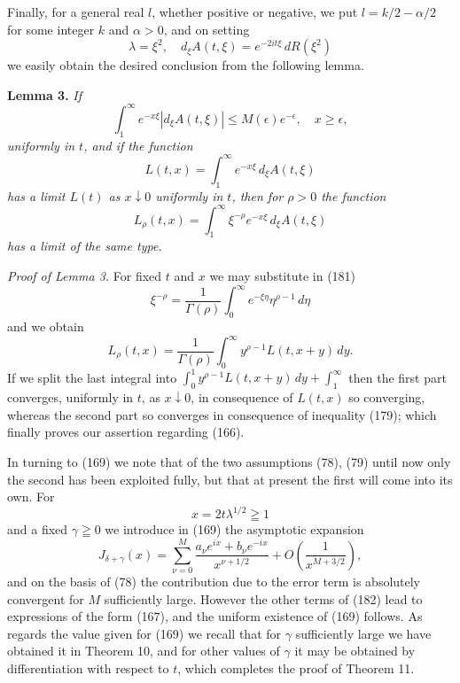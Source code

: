 \documentclass[12pt]{article}
\begin{document}
Finally, for a general real \(l\), whether positive or negative, we put \(l = k/2 - \alpha/2\) for some integer \(k\) and \(\alpha > 0\), and on setting
\[
\lambda = \xi^2, \quad d_\xi A(t, \xi) = e^{-2it\xi} \, dR(\xi^2)
\]
we easily obtain the desired conclusion from the following lemma.

\medskip

\noindent\textbf{Lemma 3.} \emph{If}
\begin{equation}
\int_1^{\infty} e^{-x\xi} |d_\xi A(t, \xi)| \le M(\epsilon) e^{-\epsilon}, \quad x \ge \epsilon,
\tag{179}
\end{equation}
\emph{uniformly in \(t\), and if the function}
\begin{equation}
L(t, x) = \int_1^{\infty} e^{-x\xi} \, d_\xi A(t, \xi)
\tag{180}
\end{equation}
\emph{has a limit \(L(t)\) as \(x \downarrow 0\) uniformly in \(t\), then for \(\rho > 0\) the function}
\begin{equation}
L_\rho(t, x) = \int_1^{\infty} \xi^{-\rho} e^{-x\xi} \, d_\xi A(t, \xi)
\tag{181}
\end{equation}
\emph{has a limit of the same type.}

\medskip

\noindent\emph{Proof of Lemma 3.} For fixed \(t\) and \(x\) we may substitute in (181)
\[
\xi^{-\rho} = \frac{1}{\Gamma(\rho)} \int_0^{\infty} e^{-\xi\eta} \eta^{\rho-1} \, d\eta
\]
and we obtain
\[
L_\rho(t, x) = \frac{1}{\Gamma(\rho)} \int_0^{\infty} y^{\rho-1} L(t, x + y) \, dy.
\]
If we split the last integral into \(\int_0^1 y^{\rho-1} L(t, x + y) \, dy + \int_1^{\infty}\) then the first part converges, uniformly in \(t\), as \(x \downarrow 0\), in consequence of \(L(t, x)\) so converging, whereas the second part so converges in consequence of inequality (179); which finally proves our assertion regarding (166).

In turning to (169) we note that of the two assumptions (78), (79) until now only the second has been exploited fully, but that at present the first will come into its own. For
\[
x = 2t\lambda^{1/2} \geqq 1
\]
and a fixed \(\gamma \geqq 0\) we introduce in (169) the asymptotic expansion
\begin{equation}
J_{\delta+\gamma}(x) = \sum_{\nu=0}^M \frac{a_\nu e^{ix} + b_\nu e^{-ix}}{x^{\nu+1/2}} + O\left(\frac{1}{x^{M+3/2}}\right),
\tag{182}
\end{equation}
and on the basis of (78) the contribution due to the error term is absolutely convergent for \(M\) sufficiently large. However the other terms of (182) lead to expressions of the form (167), and the uniform existence of (169) follows. As regards the value given for (169) we recall that for \(\gamma\) sufficiently large we have obtained it in Theorem 10, and for other values of \(\gamma\) it may be obtained by differentiation with respect to \(t\), which completes the proof of Theorem 11.
\end{document}

